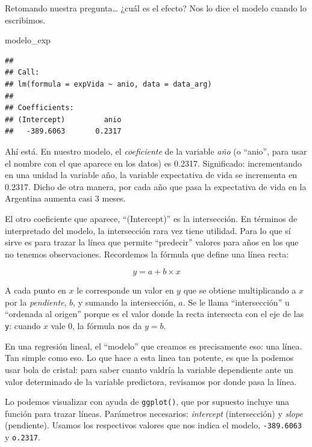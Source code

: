 \documentclass[spanish,]{book}
\newenvironment{Shaded}{\begin{snugshade}}{\end{snugshade}}
\newcommand{\NormalTok}[1]{#1}
\begin{document}
Retomando nuestra pregunta\ldots{} ¿cuál es el efecto? Nos lo dice el modelo cuando lo escribimos.

\begin{Shaded}
\begin{Highlighting}[]
\NormalTok{modelo_exp}
\end{Highlighting}
\end{Shaded}

\begin{verbatim}
## 
## Call:
## lm(formula = expVida ~ anio, data = data_arg)
## 
## Coefficients:
## (Intercept)         anio  
##   -389.6063       0.2317
\end{verbatim}

Ahí está. En nuestro modelo, el \emph{coeficiente} de la variable \emph{año} (o ``anio'', para usar el nombre con el que aparece en los datos) es 0.2317. Significado: incrementando en una unidad la variable año, la variable expectativa de vida se incrementa en 0.2317. Dicho de otra manera, por cada año que pasa la expectativa de vida en la Argentina aumenta casi 3 meses.

El otro coeficiente que aparece, ``(Intercept)'' es la intersección. En términos de interpretado del modelo, la intersección rara vez tiene utilidad. Para lo que sí sirve es para trazar la línea que permite ``predecir'' valores para años en los que no tenemos observaciones. Recordemos la fórmula que define una línea recta:

\[ y = a + b \times x \]

A cada punto en \(x\) le corresponde un valor en \(y\) que se obtiene multiplicando a \(x\) por la \emph{pendiente}, \(b\), y sumando la intersección, \(a\). Se le llama ``intersección'' u ``ordenada al origen'' porque es el valor donde la recta intersecta con el eje de las \texttt{y}: cuando \(x\) vale \(0\), la fórmula nos da \(y = b\).

En una regresión lineal, el ``modelo'' que creamos es precisamente eso: una línea. Tan simple como eso. Lo que hace a esta linea tan potente, es que la podemos usar bola de cristal: para saber cuanto valdría la variable dependiente ante un valor determinado de la variable predictora, revisamos por donde pasa la línea.

Lo podemos visualizar con ayuda de \texttt{ggplot()}, que por supuesto incluye una función para trazar líneas. Parámetros necesarios: \emph{intercept} (intersección) y \emph{slope} (pendiente). Usamos los respectivos valores que nos indica el modelo, \texttt{-389.6063} y \texttt{o.2317}.
\end{document}
